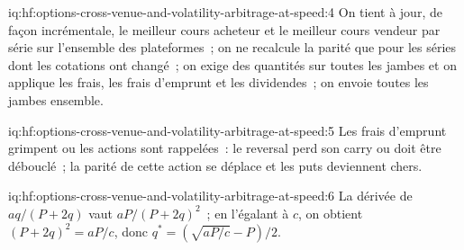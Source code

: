 \begin{solution}{iq:hf:options-cross-venue-and-volatility-arbitrage-at-speed:4}
On tient à jour, de façon incrémentale, le meilleur cours acheteur et le meilleur cours vendeur par série sur l'ensemble des plateformes~; on ne recalcule la parité que pour les séries dont les cotations ont changé~; on exige des quantités sur toutes les jambes
et on applique les frais, les frais d'emprunt et les dividendes~; on envoie toutes les jambes ensemble.
\end{solution}

\begin{solution}{iq:hf:options-cross-venue-and-volatility-arbitrage-at-speed:5}
Les frais d'emprunt grimpent ou les actions sont rappelées~: le reversal perd son carry ou doit être débouclé~; la parité de cette action se déplace et les puts deviennent chers.
\end{solution}

\begin{solution}{iq:hf:options-cross-venue-and-volatility-arbitrage-at-speed:6}
La dérivée de $aq/(P+2q)$ vaut $aP/(P+2q)^2$~; en l'égalant à $c$, on obtient $(P+2q)^2=aP/c$, donc $q^\ast=(\sqrt{aP/c}-P)/2$.
\end{solution}
